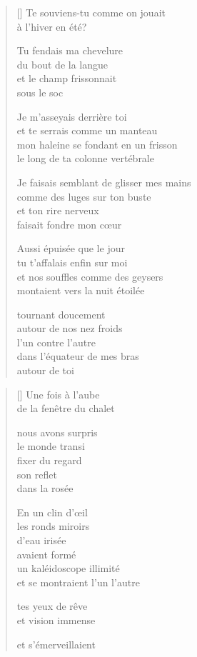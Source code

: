 \documentclass[12pt,a4paper]{article}
\begin{document}
\begin{verse}[\versewidth]
  Te souviens-tu comme on jouait \\
  à l'hiver en été?

  Tu fendais ma chevelure \\
  du bout de la langue \\
  et le champ frissonnait \\
  sous le soc

  Je m'asseyais derrière toi \\
  et te serrais comme un manteau \\
  mon haleine se fondant en un frisson \\
  le long de ta colonne vertébrale

  Je faisais semblant de glisser mes mains \\
  comme des luges sur ton buste \\
  et ton rire nerveux \\
  faisait fondre mon cœur

  Aussi épuisée que le jour \\
  tu t'affalais enfin sur moi \\
  et nos souffles comme des geysers \\
  montaient vers la nuit étoilée

  tournant doucement \\
  autour de nos nez froids \\
  l'un contre l'autre \\
  dans l'équateur de mes bras \\
  autour de toi
\end{verse}


\newpage

\poemtitle{}

\settowidth{\versewidth}{et se montraient l'un l'autre}

\bigskip

\begin{verse}[\versewidth]
  Une fois à l'aube \\
  de la fenêtre du chalet

  nous avons surpris \\
  le monde transi \\
  fixer du regard \\
  son reflet \\
  dans la rosée

  En un clin d'œil \\
  les ronds miroirs \\
  d'eau irisée \\
  avaient formé \\
  un kaléidoscope illimité \\
  et se montraient l'un l'autre

  tes yeux de rêve \\
  et vision immense

  et s'émerveillaient
\end{verse}
\end{document}
